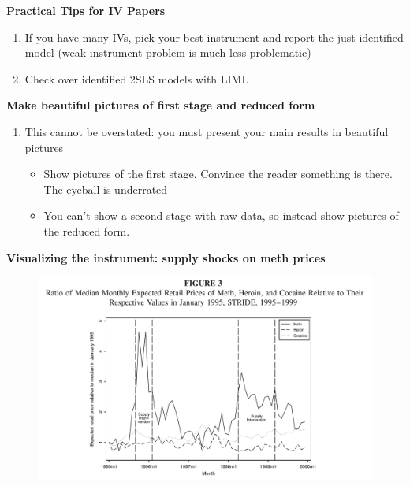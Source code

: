 \documentclass[notes=show]{beamer}
\begin{document}
\begin{frame}[plain]
	\begin{center}
	\textbf{Practical Tips for IV Papers}
	\end{center}
	
	\begin{enumerate}\addtocounter{enumi}{4}
	\item If you have many IVs, pick your best instrument and report the just identified model (weak instrument problem is much less problematic)
	\item Check over identified 2SLS models with LIML
	\end{enumerate}
\end{frame}


\begin{frame}[plain]
\begin{center}
\textbf{Make beautiful pictures of first stage and reduced form}
\end{center}

\begin{enumerate}\addtocounter{enumi}{6}
\item This cannot be overstated: you must present your main results in beautiful pictures
	\begin{itemize}
	\item Show pictures of the first stage. Convince the reader something is there.  The eyeball is underrated
	\item You can't show a second stage with raw data, so instead show pictures of the reduced form. 
	\end{itemize}
\end{enumerate}

\end{frame}




\begin{frame}[plain]

	\begin{center}
	\textbf{Visualizing the instrument: supply shocks on meth prices}
	\end{center}
	
	\begin{figure}
	\includegraphics[scale=0.15]{./lecture_includes/keith_1.png}
	\end{figure}
	
\end{frame}
\end{document}
